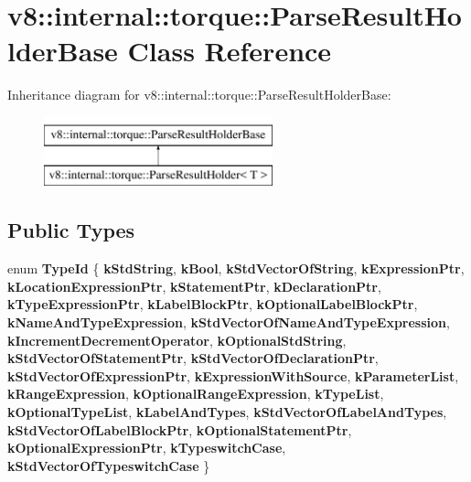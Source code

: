 \hypertarget{classv8_1_1internal_1_1torque_1_1ParseResultHolderBase}{}\section{v8\+:\+:internal\+:\+:torque\+:\+:Parse\+Result\+Holder\+Base Class Reference}
\label{classv8_1_1internal_1_1torque_1_1ParseResultHolderBase}
Inheritance diagram for v8\+:\+:internal\+:\+:torque\+:\+:Parse\+Result\+Holder\+Base\+:\begin{figure}[H]
\begin{center}
\leavevmode
\includegraphics[height=2.000000cm]{classv8_1_1internal_1_1torque_1_1ParseResultHolderBase}
\end{center}
\end{figure}
\subsection*{Public Types}
\begin{DoxyCompactItemize}
\item 
\mbox{\label{classv8_1_1internal_1_1torque_1_1ParseResultHolderBase_a78817ce4aaec8b4cf76f6d7302263660}} 
enum {\bfseries Type\+Id} \{ \newline
{\bfseries k\+Std\+String}, 
{\bfseries k\+Bool}, 
{\bfseries k\+Std\+Vector\+Of\+String}, 
{\bfseries k\+Expression\+Ptr}, 
\newline
{\bfseries k\+Location\+Expression\+Ptr}, 
{\bfseries k\+Statement\+Ptr}, 
{\bfseries k\+Declaration\+Ptr}, 
{\bfseries k\+Type\+Expression\+Ptr}, 
\newline
{\bfseries k\+Label\+Block\+Ptr}, 
{\bfseries k\+Optional\+Label\+Block\+Ptr}, 
{\bfseries k\+Name\+And\+Type\+Expression}, 
{\bfseries k\+Std\+Vector\+Of\+Name\+And\+Type\+Expression}, 
\newline
{\bfseries k\+Increment\+Decrement\+Operator}, 
{\bfseries k\+Optional\+Std\+String}, 
{\bfseries k\+Std\+Vector\+Of\+Statement\+Ptr}, 
{\bfseries k\+Std\+Vector\+Of\+Declaration\+Ptr}, 
\newline
{\bfseries k\+Std\+Vector\+Of\+Expression\+Ptr}, 
{\bfseries k\+Expression\+With\+Source}, 
{\bfseries k\+Parameter\+List}, 
{\bfseries k\+Range\+Expression}, 
\newline
{\bfseries k\+Optional\+Range\+Expression}, 
{\bfseries k\+Type\+List}, 
{\bfseries k\+Optional\+Type\+List}, 
{\bfseries k\+Label\+And\+Types}, 
\newline
{\bfseries k\+Std\+Vector\+Of\+Label\+And\+Types}, 
{\bfseries k\+Std\+Vector\+Of\+Label\+Block\+Ptr}, 
{\bfseries k\+Optional\+Statement\+Ptr}, 
{\bfseries k\+Optional\+Expression\+Ptr}, 
\newline
{\bfseries k\+Typeswitch\+Case}, 
{\bfseries k\+Std\+Vector\+Of\+Typeswitch\+Case}
 \}
\end{DoxyCompactItemize}
